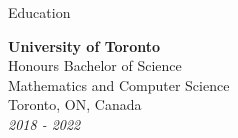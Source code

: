 \documentclass{resume} %
\begin{document}
\begin{rSection}{Education}

{\bf University of Toronto}
\\ Honours Bachelor of Science
\\ Mathematics and Computer Science
\\ Toronto, ON, Canada
\\ \textit{2018 - 2022}
\end{rSection}
\end{document}
